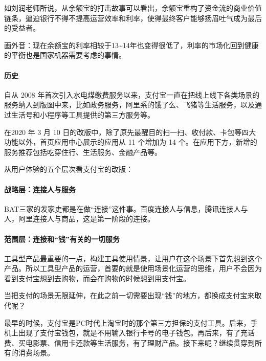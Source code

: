 \documentclass[letterpaper,11pt,english]{sphinxmanual}
\begin{document}
如刘润老师所说，从余额宝的打击故事可以看出，余额宝重构了资金流的商业价值链条，逼迫银行不得不提高运营效率和利率，使得最终客户能够扬眉吐气成为最后的受益者。

画外音：现在余额宝的利率相较于13\textasciitilde{}14年也变得很低了，利率的市场化回到健康的平衡也是国家机器需要考虑的事情。


\paragraph{历史}
\label{\detokenize{chapter_company/alipay:id3}}
自从 2008
年首次引入水电煤缴费服务以来，支付宝一直在把线上线下各类场景的服务纳入到版图中来，比如政务服务，阿里系的饿了么、飞猪等生活服务，以及通过生活号和小程序等工具提供的第三方服务等。

在2020 年 3 月 10
日的改版中，除了原先最醒目的扫一扫、收付款、卡包等四大功能以外，首页应用中心展示的应用从
11 个增加为 14
个。在应用下方，新增的服务推荐包括吃穿住行、生活服务、金融产品等。

从用户体验的五个层次看支付宝的改版：
%
\begin{footnote}[876]\sphinxAtStartFootnote
{}
%
\end{footnote}


\paragraph{战略层：连接人与服务}
\label{\detokenize{chapter_company/alipay:id4}}
BAT三家的发家史都是在做“连接”这件事。百度连接人与信息，腾讯连接人与人，阿里连接人与商品，这是第一阶段的连接。


\paragraph{范围层：连接和“钱”有关的一切服务}
\label{\detokenize{chapter_company/alipay:id5}}
工具型产品最重要的一点，构建工具使用情景，让用户在这个场景下首先想到这个产品。所以工具型产品的运营，首要的就是使用场景化运营的思维，用户不会因为看到支付宝想到去购物，而会在购物的时候想到用支付宝。

当把支付的场景无限延伸，在此之前一切需要出现“钱”的地方，都换成支付宝来取代呢？

最早的时候，支付宝是PC时代上淘宝时的那个第三方担保的支付工具。后来，手机上出现了支付宝钱包，就是不用输入银行卡号的电子钱包。再后来，有了充话费、买电影票、信用卡还款等生活服务，有了理财产品。接下来呢？继续贯穿到所有的消费场景。
\end{document}
